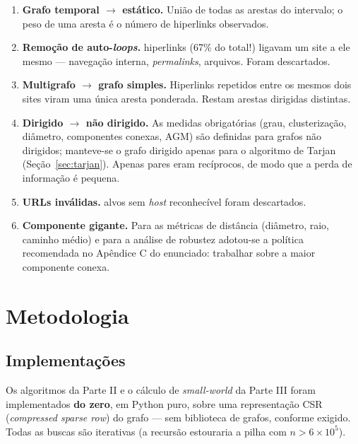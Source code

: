\documentclass[sigconf]{webmedia}
\begin{document}
\begin{enumerate}[nosep]
  \item \textbf{Grafo temporal $\to$ estático.} União de todas as arestas
        do intervalo; o peso de uma aresta é o número de hiperlinks
        observados.
  \item \textbf{Remoção de auto-\textit{loops}.} \autoLoops{} hiperlinks
        (67\% do total!) ligavam um site a ele mesmo --- navegação interna,
        \textit{permalinks}, arquivos. Foram descartados.
  \item \textbf{Multigrafo $\to$ grafo simples.} Hiperlinks repetidos entre
        os mesmos dois sites viram uma única aresta ponderada. Restam
        \arestasDirigidas{} arestas dirigidas distintas.
  \item \textbf{Dirigido $\to$ não dirigido.} As medidas obrigatórias
        (grau, clusterização, diâmetro, componentes conexas, AGM) são
        definidas para grafos não dirigidos; manteve-se o grafo dirigido
        apenas para o algoritmo de Tarjan (Seção~\ref{sec:tarjan}).
        Apenas \paresReciprocos{} pares eram recíprocos, de modo que a
        perda de informação é pequena.
  \item \textbf{URLs inválidas.} \urlsInvalidas{} alvos sem \textit{host}
        reconhecível foram descartados.
  \item \textbf{Componente gigante.} Para as métricas de distância
        (diâmetro, raio, caminho médio) e para a análise de robustez
        adotou-se a política recomendada no Apêndice C do enunciado:
        trabalhar sobre a maior componente conexa.
\end{enumerate}

\section{Metodologia}

\subsection{Implementações}

Os algoritmos da Parte II e o cálculo de \textit{small-world} da Parte III
foram implementados \textbf{do zero}, em Python puro, sobre uma
representação CSR (\textit{compressed sparse row}) do grafo --- sem
biblioteca de grafos, conforme exigido. Todas as buscas são iterativas
(a recursão estouraria a pilha com $n>6\times10^{5}$).
\end{document}
